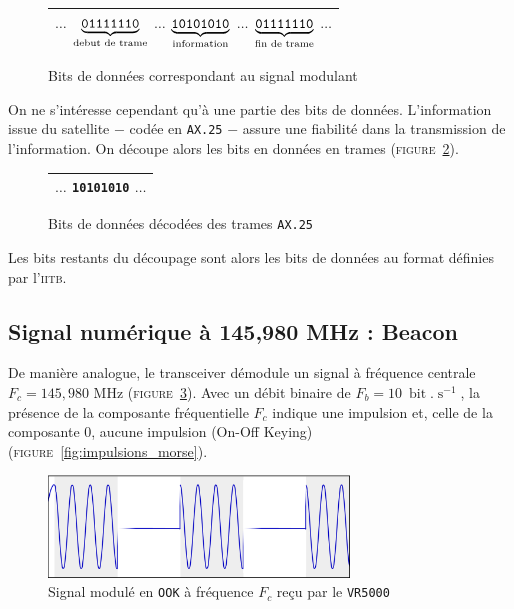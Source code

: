 \documentclass[twocolumn,pre,floats,aps,amsmath,amssymb]{revtex4}
\begin{document}
\begin{figure}[h]
  \begin{tabular}{|c|}
    \hline
    $\dots$
    \textcolor{rltred}{$\underbrace{\texttt{01111110}}_{\textup{debut de trame}}$}
    $\dots$
    \textcolor{rltgreen}{$\underbrace{\texttt{10101010}}_{\textup{information}}$}
    $\dots$
    \textcolor{rltred}{$\underbrace{\texttt{01111110}}_{\textup{fin de trame}}$}
    $\dots$\\
    \hline
  \end{tabular}
\caption{Bits de donn\'ees correspondant au signal modulant}
\label{fig:bits_donnees}
\end{figure}

On ne s'int\'eresse cependant qu'\`a une partie des bits de donn\'ees. L'information issue du satellite $-$ cod\'ee en \texttt{AX.25} $-$ assure une fiabilit\'e dans la transmission de l'information. On d\'ecoupe alors les bits en donn\'ees en trames (\textsc{figure}~\ref{fig:bits_sans_ax25}).

\begin{figure}[h]
  \begin{tabular}{|c|}
    \hline
    $\dots$ \textcolor{rltgreen}{\texttt{10101010}} $\dots$\\
    \hline
  \end{tabular}
  \caption{Bits de donn\'ees d\'ecod\'ees des trames \texttt{AX.25}}
  \label{fig:bits_sans_ax25}
\end{figure}

Les bits restants du d\'ecoupage sont alors les bits de donn\'ees au format d\'efinies par l'\textsc{iitb}\cite{IITB}.

\subsection{Signal num\'erique \`a 145,980 MHz : Beacon}

De mani\`ere analogue, le transceiver d\'emodule un signal \`a fr\'equence centrale $F_c = 145,980$ MHz (\textsc{figure}~\ref{fig:signal_ook}). Avec un d\'ebit binaire de $F_b = 10 \ \operatorname{bit}.\operatorname{s}^{-1}$, la pr\'esence de la composante fr\'equentielle $F_c$ indique une impulsion et, celle de la composante $0$, aucune impulsion (On-Off Keying) (\textsc{figure}~\ref{fig:impulsions_morse}).

\begin{figure}[h]
  \includegraphics[width=8cm]{sans_porteuse.png}
  \caption{Signal modul\'e en \texttt{OOK} \`a fr\'equence $F_c$ re\c{c}u par le \texttt{VR5000}}
  \label{fig:signal_ook}
\end{figure}
\end{document}

